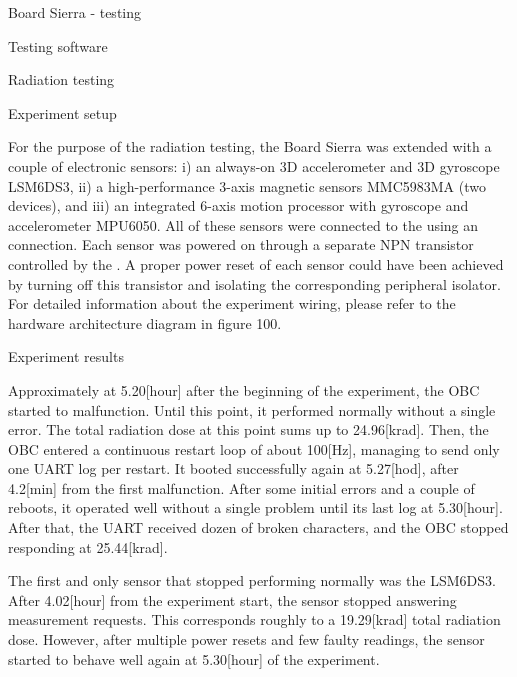 

\chap Board Sierra - testing


\sec Testing software





\sec Radiation testing





\secc Experiment setup

\quad For the purpose of the radiation testing, the Board Sierra was extended with a couple of electronic sensors: i) an always-on 3D accelerometer and 3D gyroscope LSM6DS3, ii) a high-performance 3-axis magnetic sensors MMC5983MA (two devices), and iii) an integrated 6-axis motion processor with gyroscope and accelerometer MPU6050. All of these sensors were connected to the  using an  connection.  Each sensor was powered on through a separate NPN transistor controlled by the . A proper power reset of each sensor could have been achieved by turning off this transistor and isolating the corresponding  peripheral isolator. For detailed information about the experiment wiring, please refer to the hardware architecture diagram in figure 100.



\secc Experiment results

Approximately at 5.20[hour] after the beginning of the experiment, the OBC started to malfunction. Until this point, it performed normally without a single error. The total radiation dose at this point sums up to 24.96[krad]. Then, the OBC entered a continuous restart loop of about 100[Hz], managing to send only one UART log per restart. It booted successfully again at 5.27[hod], after 4.2[min] from the first malfunction. After some initial errors and a couple of reboots, it operated well without a single problem until its last log at 5.30[hour]. After that, the UART received dozen of broken characters, and the OBC stopped responding at 25.44[krad].

The first and only sensor that stopped performing normally was the LSM6DS3. After 4.02[hour] from the experiment start, the sensor stopped answering measurement requests. This corresponds roughly to a 19.29[krad] total radiation dose. However, after multiple power resets and few faulty readings, the sensor started to behave well again at 5.30[hour] of the experiment.


